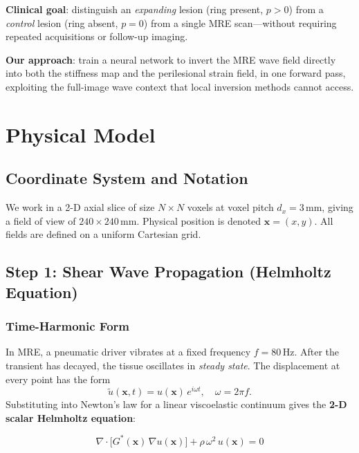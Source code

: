 \documentclass[11pt,letterpaper]{article}
\newcommand{\xvec}{\bm{x}}
\newcommand{\Gstar}{G^*}
\begin{document}
\textbf{Clinical goal}: distinguish an \emph{expanding} lesion (ring present, $p > 0$) from
a \emph{control} lesion (ring absent, $p = 0$) from a single MRE scan---without requiring
repeated acquisitions or follow-up imaging.

\textbf{Our approach}: train a neural network to invert the MRE wave field directly into
both the stiffness map and the perilesional strain field, in one forward pass, exploiting
the full-image wave context that local inversion methods cannot access.

\section{Physical Model}

\subsection{Coordinate System and Notation}

We work in a 2-D axial slice of size $N \times N$ voxels at voxel pitch $d_x = 3$\,mm,
giving a field of view of $240 \times 240$\,mm. Physical position is denoted
$\xvec = (x, y)$. All fields are defined on a uniform Cartesian grid.

\subsection{Step 1: Shear Wave Propagation (Helmholtz Equation)}

\subsubsection{Time-Harmonic Form}

In MRE, a pneumatic driver vibrates at a fixed frequency $f = 80$\,Hz. After the
transient has decayed, the tissue oscillates in \emph{steady state}. The displacement at
every point has the form
\[
    \tilde{u}(\xvec, t) = u(\xvec)\,e^{i\omega t}, \quad \omega = 2\pi f.
\]
Substituting into Newton's law for a linear viscoelastic continuum gives the
\textbf{2-D scalar Helmholtz equation}:

\begin{physicbox}
\begin{equation}\label{eq:helmholtz}
    \nabla \cdot \bigl[\Gstar(\xvec)\,\nabla u(\xvec)\bigr]
    + \rho\,\omega^2\, u(\xvec) = 0
\end{equation}
\end{physicbox}
\end{document}
